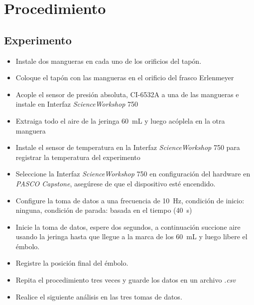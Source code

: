 \documentclass[12pt,letterpaper]{report}
\newcommand{\pro}{Procedimiento}
\begin{document}
\section{\pro}
\subsection{Experimento}
\begin{itemize}
    \item Instale dos mangueras en cada uno de los orificios del tapón.
    \item Coloque el tapón con las mangueras en el orificio del frasco Erlenmeyer
    \item Acople el sensor de presión absoluta, CI-6532A a una de las mangueras e instale en Interfaz \textit{ScienceWorkshop} 750
    \item Extraiga todo el aire de la jeringa \SI{60}{\milli\liter} y luego acóplela en la otra manguera
    \item Instale el sensor de temperatura en la Interfaz \textit{ScienceWorkshop} 750 para registrar la temperatura del experimento
    \item Seleccione la Interfaz \textit{ScienceWorkshop} 750 en configuración del hardware en \textit{PASCO Capstone}, asegúrese de que el dispositivo esté encendido.
    \item Configure la toma de datos a una frecuencia de \SI{10}{\hertz}, condición de inicio: ninguna, condición de parada: basada en el tiempo (\SI{40}{\second})
    \item Inicie la toma de datos, espere dos segundos, a continuación succione aire usando la jeringa hasta que llegue a la marca de los \SI{60}{\milli\liter} y luego libere el émbolo.
    \item Registre la posición final del émbolo.
    \item Repita el procedimiento tres veces y guarde los datos en un archivo \emph{.csv}
    \item Realice el siguiente análisis en las tres tomas de datos. 
\end{itemize}
\end{document}
